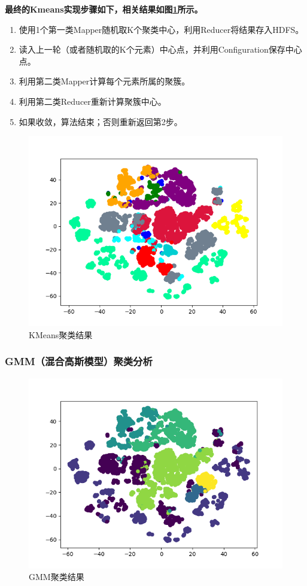 \documentclass{ML}
\begin{document}
\textbf{最终的Kmeans实现步骤如下，相关结果如图\ref{fig:kmeans}所示。}
\begin{enumerate}
    \item 使用1个第一类Mapper随机取K个聚类中心，利用Reducer将结果存入HDFS。
    \item 读入上一轮（或者随机取的K个元素）中心点，并利用Configuration保存中心点。
    \item 利用第二类Mapper计算每个元素所属的聚簇。
    \item 利用第二类Reducer重新计算聚簇中心。
    \item 如果收敛，算法结束；否则重新返回第2步。
\end{enumerate}
\begin{figure}[hbt]
    \centering
    \includegraphics[width=0.8\linewidth]{media/cluster_1.png}
    \caption{KMeans聚类结果}\label{fig:kmeans}
\end{figure}
\subsubsection{GMM（混合高斯模型）聚类分析}
\begin{figure}[hbt]
    \centering
    \includegraphics[width=0.8\linewidth]{media/GMM.png}    
    \caption{GMM聚类结果}\label{fig:gmm}
\end{figure}
\end{document}
